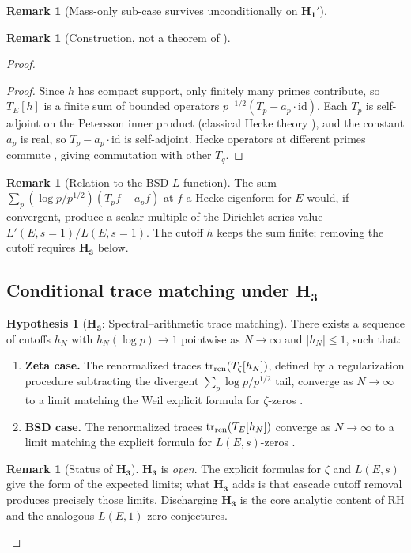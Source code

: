 \documentclass[11pt, a4paper]{amsart}
\theoremstyle{definition}
\newtheorem{remark}[theorem]{Remark}
\newtheorem{hypothesis}[theorem]{Hypothesis}
\begin{document}
\begin{remark}[Mass-only sub-case survives unconditionally on $\mathbf{H_1'}$]
\begin{remark}[Construction, not a theorem of \cite{CascadeEmbeddings}]
\begin{proof}
\begin{proof}
Since $h$ has compact support, only finitely many primes
contribute, so $T_E[h]$ is a finite sum of bounded operators
$p^{-1/2}(T_p - a_p \cdot \mathrm{id})$. Each $T_p$ is
self-adjoint on the Petersson inner product (classical Hecke
theory \cite{DiamondShurman}), and the constant $a_p$ is real, so
$T_p - a_p \cdot \mathrm{id}$ is self-adjoint. Hecke operators at
different primes commute \cite{DiamondShurman}, giving commutation
with other $T_q$.
\end{proof}

\begin{remark}[Relation to the BSD $L$-function]
The sum
$\sum_p (\log p/p^{1/2})(T_p f - a_p f)$ at $f$ a Hecke eigenform
for $E$ would, if convergent, produce a scalar multiple of the
Dirichlet-series value $L'(E, s=1)/L(E, s=1)$. The cutoff $h$ keeps
the sum finite; removing the cutoff requires
$\mathbf{H_3}$ below.
\end{remark}

\subsection{Conditional trace matching under $\mathbf{H_3}$}
\label{subsec:H3}

\begin{hypothesis}[$\mathbf{H_3}$: Spectral--arithmetic trace
matching]
\label{hyp:H3}
There exists a sequence of cutoffs $h_N$ with
$h_N(\log p) \to 1$ pointwise as $N \to \infty$ and
$|h_N| \leq 1$, such that:
\begin{enumerate}
\item \textbf{Zeta case.} The renormalized traces
  $\operatorname{tr}_{\rm ren}(T_\zeta[h_N])$, defined by a
  regularization procedure subtracting the divergent
  $\sum_p \log p / p^{1/2}$ tail, converge as $N \to \infty$ to a
  limit matching the Weil explicit formula for $\zeta$-zeros
  \cite[\S 2.4]{DGOTI}.
\item \textbf{BSD case.} The renormalized traces
  $\operatorname{tr}_{\rm ren}(T_E[h_N])$ converge as
  $N \to \infty$ to a limit matching the explicit formula for
  $L(E, s)$-zeros
  \cite[\S 5]{IwaniecKowalski}.
\end{enumerate}
\end{hypothesis}

\begin{remark}[Status of $\mathbf{H_3}$]
$\mathbf{H_3}$ is \emph{open}. The explicit formulas for $\zeta$
and $L(E, s)$ \cite[\S 2.4]{DGOTI} give the form of the expected
limits; what $\mathbf{H_3}$ adds is that cascade cutoff removal
produces precisely those limits. Discharging $\mathbf{H_3}$ is the
core analytic content of RH and the analogous $L(E, 1)$-zero
conjectures.
\end{remark}


\end{proof}
\end{remark}
\end{remark}
\end{document}
